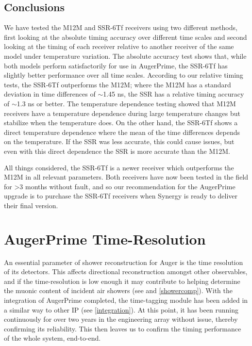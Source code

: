 \subsection{Conclusions}
We have tested the M12M and SSR-6Tf receivers using two different
methods, first looking at the absolute timing accuracy over different
time scales and second looking at the timing of each receiver relative
to another receiver of the same model under temperature variation. The
absolute accuracy test shows that, while both models perform
satisfactorily for use in AugerPrime, the SSR-6Tf has slightly better
performance over all time scales. According to our relative timing
tests, the SSR-6Tf outperforms the M12M; where the
M12M has a standard deviation in time differences of $\sim$1.45 ns, the
SSR has a relative timing accuracy of $\sim$1.3 ns or better. The
temperature dependence testing showed that M12M receivers have a
temperature dependence during large temperature changes but stabilize
when the temperature does. On the other hand, the SSR-6Tf shows a
direct temperature dependence where the mean of the time differences
depends on the temperature. If the SSR was less accurate, this could
cause issues, but even with this direct dependence the SSR is more
accurate than the M12M.

All things considered, the SSR-6Tf is a newer receiver which
outperforms the M12M in all relevant parameters. Both receivers have now been tested in the field for \textgreater 3 months without fault, and so our recommendation for the AugerPrime upgrade is to purchase the SSR-6Tf receivers when Synergy is
ready to deliver their final version.

\section{AugerPrime Time-Resolution} %
\label{money}%
An essential parameter of shower reconstruction for Auger is the time resolution of its detectors. This affects directional reconstruction amongst other observables, and if the time-resolution is low enough it may contribute to helping determine the muonic content of incident air showers (see \textcite{mupart} and \autoref{showercomp}). With the integration of AugerPrime completed, the time-tagging module has been added in a similar way to other IP (see \autoref{integration}). At this point, it has been running continuously for over two years in the engineering array without issue, thereby confirming its reliability. This then leaves us to confirm the timing performance of the whole system, end-to-end. 

